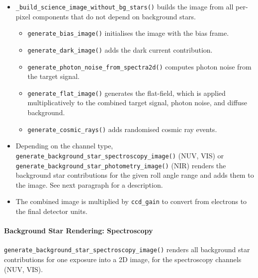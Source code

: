\begin{itemize}
    \item \texttt{\_build\_science\_image\_without\_bg\_stars()} builds the image from all per-pixel components that do not depend on background stars.
          \begin{itemize}
              \item \texttt{generate\_bias\_image()} initialises the image with the bias frame.
              \item \texttt{generate\_dark\_image()} adds the dark current contribution.
              \item \texttt{generate\_photon\_noise\_from\_spectra2d()} computes photon noise from the target signal.
              \item \texttt{generate\_flat\_image()} generates the flat-field, which is applied multiplicatively to the combined target signal, photon noise, and diffuse background.
              \item \texttt{generate\_cosmic\_rays()} adds randomised cosmic ray events.
          \end{itemize}

    \item Depending on the channel type, \texttt{generate\_background\_star\_spectroscopy\_image()} (NUV, VIS) or \texttt{generate\_background\_star\_photometry\_image()} (NIR) renders the background star contributions for the given roll angle range and adds them to the image. See next paragraph for a description.

    \item The combined image is multiplied by \texttt{ccd\_gain} to convert from electrons to the final detector units.
\end{itemize}

\paragraph{Background Star Rendering: Spectroscopy}

\texttt{generate\_background\_star\_spectroscopy\_image()} renders all background star contributions for one exposure into a 2D image, for the spectroscopy channels (NUV, VIS).

